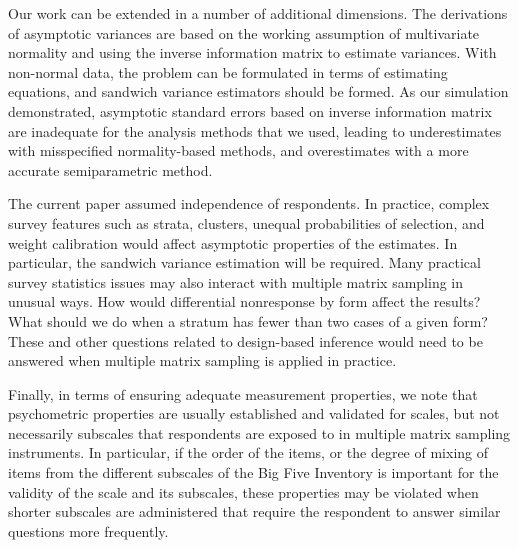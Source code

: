 \documentclass[11pt]{asaproc}
\begin{document}
Our work can be extended in a number of additional dimensions. The derivations of asymptotic
variances are based on the working assumption of multivariate normality and using
the inverse information matrix to estimate variances. With non-normal data, the problem
can be formulated in terms of estimating equations, and sandwich variance estimators
should be formed. As our simulation demonstrated, asymptotic standard errors based on
inverse information matrix are inadequate for the analysis methods that we used,
leading to underestimates with misspecified normality-based methods, and overestimates with
a more accurate semiparametric method.

The current paper assumed independence of respondents. In practice, complex survey features
such as strata, clusters, unequal probabilities of selection, and weight calibration would
affect asymptotic properties of the estimates. In particular, the sandwich variance estimation
will be required. Many practical survey statistics issues may also interact with multiple
matrix sampling in unusual ways. How would differential nonresponse by form affect the results?
What should we do when a stratum has fewer than two cases of a given form? These and other
questions related to design-based inference would need to be answered when multiple matrix sampling
is applied in practice.

Finally, in terms of ensuring adequate measurement properties, we note
that psychometric properties are usually established and validated for scales,
but not necessarily subscales that respondents are exposed to in multiple matrix sampling instruments.
In particular, if the order of the items, or the degree of mixing of items from the different
subscales of the Big Five Inventory is important for the validity of the scale and its subscales,
these properties may be violated when shorter subscales are administered that require
the respondent to answer similar questions more frequently.


\clearpage



\end{document}

